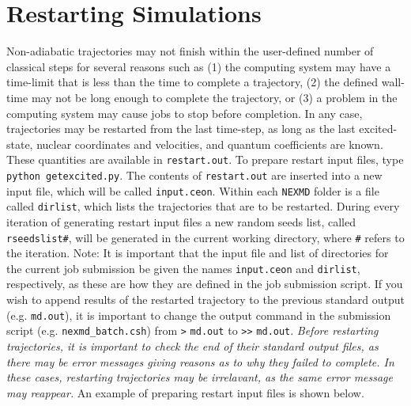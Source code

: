 \documentclass[letterpaper,12pt,titlepage]{article}
\begin{document}
\section{Restarting Simulations}
\label{restart}
Non-adiabatic trajectories may not finish within the user-defined number of classical steps for several reasons such as (1) the computing system may have a time-limit that is less than the time to complete a trajectory, (2) the defined wall-time may not be long enough to complete the trajectory, or (3) a problem in the computing system may cause jobs to stop before completion.  In any case, trajectories may be restarted from the last time-step, as long as the last excited-state, nuclear coordinates and velocities, and quantum coefficients are known.  These quantities are available in \verb+restart.out+.  To prepare restart input files, type \verb+python getexcited.py+.  The contents of \verb+restart.out+ are inserted into a new input file, which will be called \verb+input.ceon+.  Within each \verb+NEXMD+ folder is a file called \verb+dirlist+, which lists the trajectories that are to be restarted.  During every iteration of generating restart input files a new random seeds list, called \verb+rseedslist#+, will be generated in the current working directory, where \verb+#+ refers to the iteration.  Note: It is important that the input file and list of directories for the current job submission be given the names \verb+input.ceon+ and \verb+dirlist+, respectively, as these are how they are defined in the job submission script.  If you wish to append results of the restarted trajectory to the previous standard output (e.g. \verb+md.out+), it is important to change the output command in the submission script (e.g. \verb+nexmd_batch.csh+) from \verb+>+ \verb+md.out+ to \verb+>>+ \verb+md.out+.  \textit{Before restarting trajectories, it is important to check the end of their standard output files, as there may be error messages giving reasons as to why they failed to complete.  In these cases, restarting trajectories may be irrelavant, as the same error message may reappear.}  An example of preparing restart input files is shown below.
\end{document}
